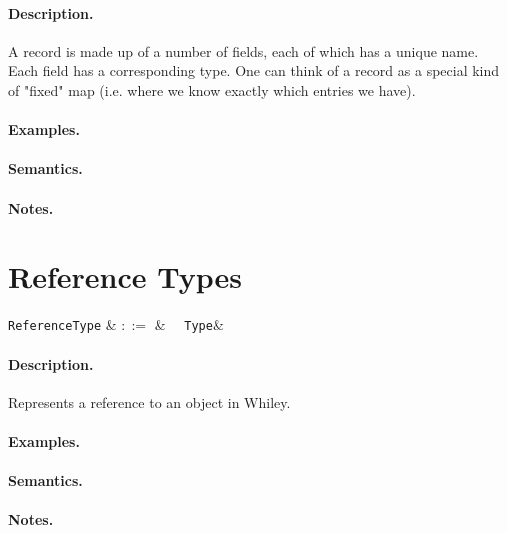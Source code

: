 \paragraph{Description.}   A record is made up of a number of fields,
each of which has a unique name. Each field has a corresponding
type. One can think of a record as a special kind of "fixed" map
(i.e. where we know exactly which entries we have).

\paragraph{Examples.}

\paragraph{Semantics.}

\paragraph{Notes.}


\section{Reference Types}

\begin{syntax}
  \verb+ReferenceType+ & $::=$ & \token{\&}\ \ \verb+Type+&\\
\end{syntax}

\paragraph{Description.}  Represents a reference to an object in Whiley.

\paragraph{Examples.}

\paragraph{Semantics.}

\paragraph{Notes.}

